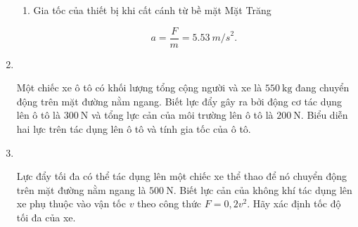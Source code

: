 \begin{enumerate}[label=\bfseries Bài \arabic*:]
{\begin{enumerate}[label=\alph*)]
		- Lực nâng của động cơ: $F_\text{n} = \SI{500}{N}.$
		
		- Lực hấp dẫn của Mặt Trăng tác dụng lên thiết bị: $P = \SI{112}{N}.$
		
		Hai lực này cùng phương, ngược chiều.
		
		- Tổng hợp lực nâng của động cơ và lực hấp dẫn của Mặt Trăng tác dụng lên thiết bị là:
		
		$$F = F_\text{n} - P = \SI{388}{N}.$$
		
		\item Gia tốc của thiết bị khi cất cánh từ bề mặt Mặt Trăng
		
		$$a = \dfrac{F}{m} = \SI{5,53}{m/s}^2.$$
		
	\end{enumerate}
}

\item {}\\
{Một chiếc xe ô tô có khối lượng tổng cộng người và xe là $\SI{550}{\kilogram}$ đang chuyển động trên mặt đường nằm ngang. Biết lực đẩy gây ra bởi động cơ tác dụng lên ô tô là $\SI{300}{\newton}$ và tổng lực cản của môi trường lên ô tô là $\SI{200}{\newton}$. Biểu diễn hai lực trên tác dụng lên ô tô và tính gia tốc của ô tô.

}

\item {}\\
{Lực đẩy tối đa có thể tác dụng lên một chiếc xe thể thao để nó chuyển động trên mặt đường nằm ngang là $\SI{500}{\newton}$. Biết lực cản của không khí tác dụng lên xe phụ thuộc vào vận tốc $v$ theo công thức $F=0,2v^2$. Hãy xác định tốc độ tối đa của xe.

}


\end{enumerate}

